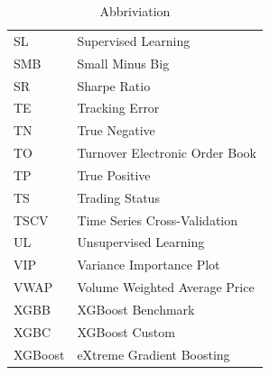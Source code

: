 \begin{appendices}
\begin{table}[H]
\begin{tabularx}{\textwidth}{ll}
SL & Supervised Learning \\
SMB & Small Minus Big \\
SR & Sharpe Ratio \\
TE & Tracking Error \\
TN & True Negative \\
TO & Turnover Electronic Order Book \\
TP & True Positive \\
TS & Trading Status \\
TSCV & Time Series Cross-Validation \\
UL & Unsupervised Learning \\
VIP & Variance Importance Plot \\
VWAP & Volume Weighted Average Price\\
XGBB & XGBoost Benchmark \\
XGBC & XGBoost Custom \\
XGBoost & eXtreme Gradient Boosting \\
\hline
\end{tabularx}
\vspace{1em}
\caption{Abbriviation}
\label{from-gics-to-icb}
\end{table}




\end{appendices}
